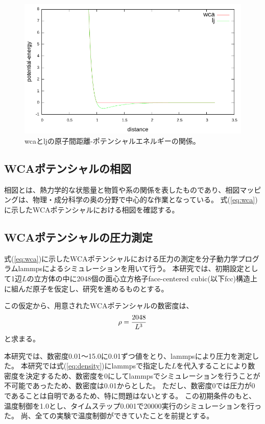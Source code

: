 \documentclass[titlepage]{jsreport}
\begin{document}
\begin{figure}[htbp]
    \begin{center}
        \includegraphics[width=14cm]{fig/dis-poen.pdf}
    \end{center}
    \caption{wcaとljの原子間距離-ポテンシャルエネルギーの関係。}
    \label{fig:dis-poen}
\end{figure}

\newpage
\subsection{WCAポテンシャルの相図}\label{method-subsec:WCA-phase}
相図とは、熱力学的な状態量と物質や系の関係を表したものであり、相図マッピングは、物理・成分科学の奥の分野で中心的な作業となっている。\cite{phase-diagram}
式(\ref{eq:wca})に示したWCAポテンシャルにおける相図を確認する。


\subsection{WCAポテンシャルの圧力測定}\label{method-subsec:WCA-pressure}
式(\ref{eq:wca})に示したWCAポテンシャルにおける圧力の測定を分子動力学プログラムlammps\cite{lammps}によるシミュレーションを用いて行う。
本研究では、初期設定として1辺$L$の立方体の中に2048個の面心立方格子face-centered cubic(以下fcc)構造上に組んだ原子を仮定し、研究を進めるものとする。

この仮定から、用意されたWCAポテンシャルの数密度は、
\large
\begin{equation}
\rho = {\frac{2048}{L^3}}{\label{eq:density}}
\end{equation}
\normalsize
と求まる。

本研究では、数密度0.01〜15.0に0.01ずつ値をとり、lammpsにより圧力を測定した。
本研究では式(\ref{eq:density})にlammpsで指定した$L$を代入することにより数密度を決定するため、数密度を0にしてlammpsでシミュレーションを行うことが不可能であったため、数密度は0.01からとした。
ただし、数密度0では圧力が0であることは自明であるため、特に問題はないとする。
この初期条件のもと、温度制御を1.0とし、タイムステップ0.001で20000実行のシミュレーションを行った。
尚、全ての実験で温度制御ができていたことを前提とする。
\end{document}
